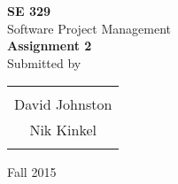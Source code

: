 \begin{titlepage}

\begin{center}

\textup{\small {\bf SE 329} \\ Software Project Management}\\[0.2in]

\Huge \textbf {Assignment 2}\\[0.5in]

\normalsize Submitted by \\
\begin{table}[h]
\centering
\begin{tabular}{c}\hline \\
David Johnston \\
Nik Kinkel\\
\\ \hline
\end{tabular}
\end{table}

\vfill

\vspace{0.2cm}
Fall 2015

\end{center}
\end{titlepage}
